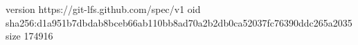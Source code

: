 version https://git-lfs.github.com/spec/v1
oid sha256:d1a951b7dbdab8bceb66ab110bb8ad70a2b2db0ca52037fc76390ddc265a2035
size 174916
